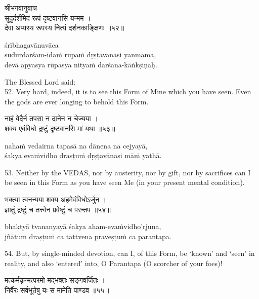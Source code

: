 \begin{gitaverse}
श्रीभगवानुवाच \\
सुदुर्दर्शमिदं रूपं दृष्टवानसि यन्मम । \\
देवा अप्यस्य रूपस्य नित्यं दर्शनकाङ्क्षिणः ॥५२॥
\end{gitaverse}

\begin{transliteration}
śrībhagavānuvāca \\
sudurdarśam-idaṁ rūpaṁ dṛṣṭavānasi yanmama, \\
devā apyasya rūpasya nityaṁ darśana-kāṅkṣiṇaḥ.
\end{transliteration}

The Blessed Lord said: \\
52. Very hard, indeed, it is to see this Form of Mine which you have seen. Even
the gods are ever longing to behold this Form.

\begin{gitaverse}
नाहं वेदैर्न तपसा न दानेन न चेज्यया । \\
शक्य एवंविधो द्रष्टुं दृष्टवानसि मां यथा ॥५३॥
\end{gitaverse}

\begin{transliteration}
nahaṁ vedairna tapasā na dānena na cejyayā, \\
śakya evaṁvidho draṣṭuṁ dṛṣṭavānasi māṁ yathā.
\end{transliteration}

53. Neither by the VEDAS, nor by austerity, nor by gift, nor by sacrifices can
I be seen in this Form as you have seen Me (in your present mental condition).

\begin{gitaverse}
भक्त्या त्वनन्यया शक्य अहमेवंविधोऽर्जुन । \\
ज्ञातुं द्रष्टुं च तत्त्वेन प्रवेष्टुं च परन्तप ॥५४॥
\end{gitaverse}

\begin{transliteration}
bhaktyā tvananyayā śakya aham-evaṁvidho'rjuna, \\
jñātuṁ draṣṭuṁ ca tattvena praveṣṭuṁ ca parantapa.
\end{transliteration}

54. But, by single-minded devotion, can I, of this Form, be `known' and `seen'
in reality, and also `entered' into, O Parantapa (O scorcher of your foes)!

\begin{gitaverse}
मत्कर्मकृन्मत्परमो मद्भक्तः सङ्गवर्जितः । \\
निर्वैरः सर्वभूतेषु यः स मामेति पाण्डव ॥५५॥
\end{gitaverse}

